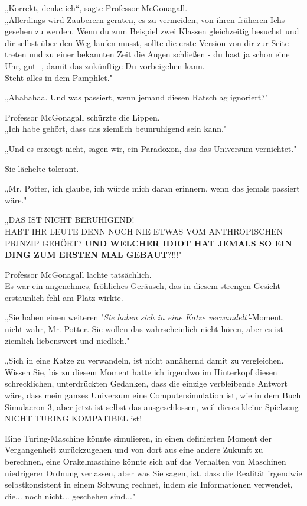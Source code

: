 {„Korrekt, denke ich“, sagte Professor McGonagall.\\ „Allerdings wird Zauberern geraten, es zu vermeiden, von ihren früheren Ichs gesehen zu werden. Wenn du zum Beispiel zwei Klassen gleichzeitig besuchst und dir selbst über den Weg laufen musst, sollte die erste Version von dir zur Seite treten und zu einer bekannten Zeit die Augen schließen - du hast ja schon eine Uhr, gut -, damit das zukünftige Du vorbeigehen kann.\\ Steht alles in dem Pamphlet."

„Ahahahaa. Und was passiert, wenn jemand diesen Ratschlag ignoriert?"

Professor McGonagall schürzte die Lippen.\\ „Ich habe gehört, dass das ziemlich beunruhigend sein kann."

„Und es erzeugt nicht, sagen wir, ein Paradoxon, das das Universum vernichtet."

Sie lächelte tolerant.

„Mr. Potter, ich glaube, ich würde mich daran erinnern, wenn das jemals passiert wäre."

„DAS IST NICHT BERUHIGEND!\\ HABT IHR LEUTE DENN NOCH NIE ETWAS VOM ANTHROPISCHEN PRINZIP GEHÖRT? \textbf{UND WELCHER IDIOT HAT JEMALS SO EIN DING ZUM ERSTEN MAL GEBAUT}?!!!"

Professor McGonagall lachte tatsächlich.\\ Es war ein angenehmes, fröhliches Geräusch, das in diesem strengen Gesicht erstaunlich fehl am Platz wirkte.

„Sie haben einen weiteren '\emph{Sie haben sich in eine Katze verwandelt'}-Moment, nicht wahr, Mr. Potter. Sie wollen das wahrscheinlich nicht hören, aber es ist ziemlich liebenswert und niedlich."

„Sich in eine Katze zu verwandeln, ist nicht annähernd damit zu vergleichen.\\ Wissen Sie, bis zu diesem Moment hatte ich irgendwo im Hinterkopf diesen schrecklichen, unterdrückten Gedanken, dass die einzige verbleibende Antwort wäre, dass mein ganzes Universum eine Computersimulation ist, wie in dem Buch Simulacron 3, aber jetzt ist selbst das ausgeschlossen, weil dieses kleine Spielzeug NICHT TURING KOMPATIBEL ist!

Eine Turing-Maschine könnte simulieren, in einen definierten Moment der Vergangenheit zurückzugehen und von dort aus eine andere Zukunft zu berechnen, eine Orakelmaschine könnte sich auf das Verhalten von Maschinen niedrigerer Ordnung verlassen, aber was Sie sagen, ist, dass die Realität irgendwie selbstkonsistent in einem Schwung rechnet, indem sie Informationen verwendet, die... noch nicht... geschehen sind..."

}
